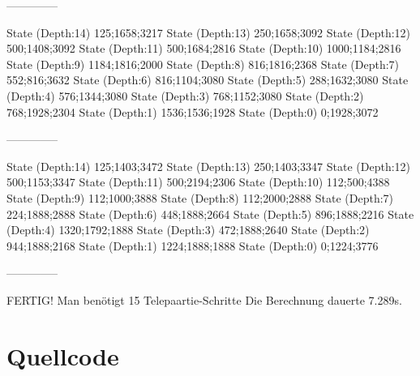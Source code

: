 \documentclass[a4paper,10pt,ngerman]{scrartcl}
\begin{document}


\begin{lstcs}
--------------

State (Depth:14) {125;1658;3217}
State (Depth:13) {250;1658;3092}
State (Depth:12) {500;1408;3092}
State (Depth:11) {500;1684;2816}
State (Depth:10) {1000;1184;2816}
State (Depth:9) {1184;1816;2000}
State (Depth:8) {816;1816;2368}
State (Depth:7) {552;816;3632}
State (Depth:6) {816;1104;3080}
State (Depth:5) {288;1632;3080}
State (Depth:4) {576;1344;3080}
State (Depth:3) {768;1152;3080}
State (Depth:2) {768;1928;2304}
State (Depth:1) {1536;1536;1928}
State (Depth:0) {0;1928;3072}

--------------

State (Depth:14) {125;1403;3472}
State (Depth:13) {250;1403;3347}
State (Depth:12) {500;1153;3347}
State (Depth:11) {500;2194;2306}
State (Depth:10) {112;500;4388}
State (Depth:9) {112;1000;3888}
State (Depth:8) {112;2000;2888}
State (Depth:7) {224;1888;2888}
State (Depth:6) {448;1888;2664}
State (Depth:5) {896;1888;2216}
State (Depth:4) {1320;1792;1888}
State (Depth:3) {472;1888;2640}
State (Depth:2) {944;1888;2168}
State (Depth:1) {1224;1888;1888}
State (Depth:0) {0;1224;3776}

--------------


FERTIG!
Man benötigt 15 Telepaartie-Schritte
Die Berechnung dauerte 7.289s.
\end{lstcs}

\section{Quellcode}
\end{document}
